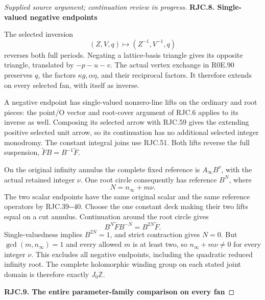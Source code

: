 \begin{proof}[Supplied source argument; continuation review in progress]
\par

\medskip\noindent\textbf{RJC.8. Single-valued negative endpoints}

\par\nobreak

The selected inversion
\[
 (Z,V,q)\longmapsto(Z^{-1},V^{-1},q)
 \tag{RJC.59}
\]
reverses both full periods. Negating a lattice-basis
triangle gives its opposite triangle, translated by
\(-p-u-v\). The actual vertex exchange in R0E.90
preserves \(q\), the factors \(\kappa g,\alpha\eta\),
and their reciprocal factors. It therefore extends
on every selected fan, with itself as inverse.

A negative endpoint has single-valued nonzero-line
lifts on the ordinary and root pieces: the point/O
vector and root-cover argument of RJC.6 applies to
its inverse as well. Composing its selected arrow
with RJC.59 gives the extending positive selected
unit arrow, so its continuation has no additional
selected integer monodromy. The constant integral
joins use RJC.51. Both lifts reverse the full
suspension,
\(\widetilde F B=B^{-1}\widetilde F\).

On the original infinity annulus the complete fixed
reference is \(A_\infty B^\nu\), with the actual
retained integer \(\nu\). One root circle consequently
has reference \(B^N\), where
\[
 N=n_\infty+m\nu.
 \tag{RJC.60}
\]
The two scalar endpoints have the same original
scalar and the same reference operators by RJC.39-\/-40.
Choose the one constant deck making their two lifts
equal on a cut annulus. Continuation around the
root circle gives
\[
 B^N\widetilde F B^{-N}=B^{2N}\widetilde F.
 \tag{RJC.61}
\]
Single-valuedness implies \(B^{2N}=1\), and strict
contraction gives \(N=0\).
But \(\gcd(m,n_\infty)=1\) and every allowed \(m\)
is at least two, so \(n_\infty+m\nu\ne0\) for
every integer \(\nu\). This excludes all negative
endpoints, including the quadratic reduced infinity
root. The complete holomorphic winding group on
each stated joint domain is therefore exactly
\(J_0\mathbb Z\).

\par

\medskip\noindent\textbf{RJC.9. The entire parameter-family comparison on every fan}

\par\nobreak


\end{proof}
